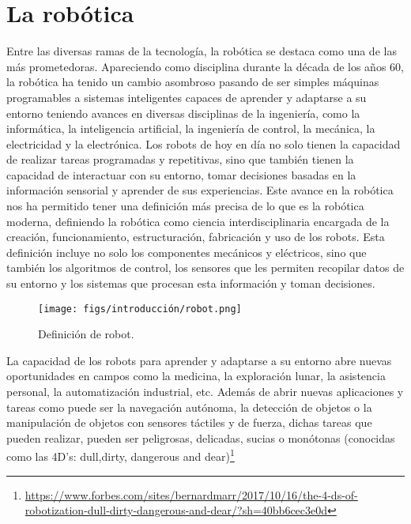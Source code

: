 \section{La robótica}
\label{sec:enfoquesrobotica}
Entre las diversas ramas de la tecnología, la robótica se destaca como una de las más prometedoras. Apareciendo como disciplina durante la década de los años 60, 
la robótica ha tenido un cambio asombroso  pasando de ser simples máquinas programables a sistemas inteligentes capaces de aprender y adaptarse 
a su entorno teniendo avances en diversas disciplinas de la ingeniería, como la informática, la inteligencia artificial, la ingeniería de control, la mecánica, 
la electricidad y la electrónica. 
Los robots de hoy en día no solo tienen la capacidad de realizar tareas programadas y repetitivas, sino que también tienen la capacidad de interactuar con su entorno, 
tomar decisiones basadas en la información sensorial y aprender de sus experiencias. Este avance en la robótica nos ha permitido tener una definición más precisa de lo que es 
la robótica moderna, definiendo la robótica como ciencia interdisciplinaria encargada de la creación, funcionamiento, estructuración, fabricación y uso de los robots. 
Esta definición incluye no solo los componentes mecánicos y eléctricos, sino que también los algoritmos de control, los sensores que les permiten recopilar
datos de su entorno y los sistemas que procesan esta información y toman decisiones.

\begin{figure} [H]
  \begin{center}
    \texttt{[image: figs/introducción/robot.png]}
  \end{center}
  \caption{Definición de robot.}
  \label{fig:robot}
  \vspace{-1.5em}
\end{figure}

La capacidad de los robots para aprender y adaptarse a su entorno abre nuevas oportunidades en campos como la medicina, la exploración lunar, la asistencia personal, la automatización industrial, etc. 
Además de abrir nuevas aplicaciones y tareas como puede ser la navegación autónoma, la detección de objetos o 
la manipulación de objetos con sensores táctiles y de fuerza, dichas tareas que pueden realizar, pueden ser peligrosas, delicadas, sucias o monótonas 
(conocidas como las 4D's: dull,dirty, dangerous and dear)\footnote{\url{https://www.forbes.com/sites/bernardmarr/2017/10/16/the-4-ds-of-robotization-dull-dirty-dangerous-and-dear/?sh=40bb6cec3e0d}}


